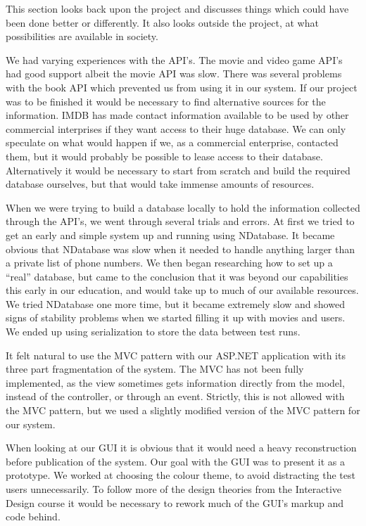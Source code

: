 This section looks back upon the project and discusses things which could have been done better or differently. It also looks outside the project, at what possibilities are available in society.

We had varying experiences with the API’s. The movie and video game API's had good support albeit the movie API was slow. There was several problems with the book API which prevented us from using it in our system. If our project was to be finished it would be necessary to find alternative sources for the information. IMDB has made contact information available to be used by other commercial interprises if they want access to their huge database. We can only speculate on what would happen if we, as a commercial enterprise, contacted them, but it would probably be possible to lease access to their database. Alternatively it would be necessary to start from scratch and build the required database ourselves, but that would take immense amounts of resources.

When we were trying to build a database locally to hold the information collected through the API’s, we went through several trials and errors. At first we tried to get an early and simple system up and running using NDatabase. It became obvious that NDatabase was slow when it needed to handle anything larger than a private list of phone numbers. We then began researching how to set up a “real” database, but came to the conclusion that it was beyond our capabilities this early in our education, and would take up to much of our available resources. We tried NDatabase one more time, but it became extremely slow and showed signs of stability problems when we started filling it up with movies and users. We ended up using serialization to store the data between test runs.

It felt natural to use the MVC pattern with our ASP.NET application with its three part fragmentation of the system. The MVC has not been fully implemented, as the view sometimes gets information directly from the model, instead of the controller, or through an event. Strictly, this is not allowed with the MVC pattern, but we used a slightly modified version of the MVC pattern for our system.     

When looking at our GUI it is obvious that it would need a heavy reconstruction before publication of the system. Our goal with the GUI was to present it as a prototype. We worked at choosing the colour theme, to avoid distracting the test users unnecessarily. To follow more of the design theories from the Interactive Design course it would be necessary to rework much of the GUI's markup and code behind.

